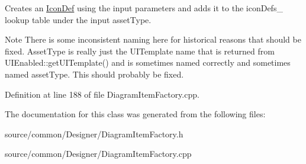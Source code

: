Creates an \hyperlink{struct_icon_def}{Icon\-Def} using the input parameters and adds it to the icon\-Defs\-\_\- lookup table under the input asset\-Type. 

\begin{DoxyNote}{Note}
There is some inconsistent naming here for historical reasons that should be fixed. Asset\-Type is really just the U\-I\-Template name that is returned from U\-I\-Enabled\-::get\-U\-I\-Template() and is sometimes named correctly and sometimes named asset\-Type. This should probably be fixed. 
\end{DoxyNote}


Definition at line 188 of file Diagram\-Item\-Factory.\-cpp.



The documentation for this class was generated from the following files\-:\begin{DoxyCompactItemize}
\item 
source/common/\-Designer/Diagram\-Item\-Factory.\-h\item 
source/common/\-Designer/Diagram\-Item\-Factory.\-cpp\end{DoxyCompactItemize}
